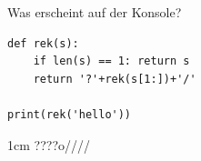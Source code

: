 \question[2]
Was erscheint auf der Konsole?
\begin{lstlisting}
def rek(s):
    if len(s) == 1: return s
    return '?'+rek(s[1:])+'/'

print(rek('hello'))
\end{lstlisting}
\begin{solutionbox}{1cm}
????o////
\end{solutionbox}
